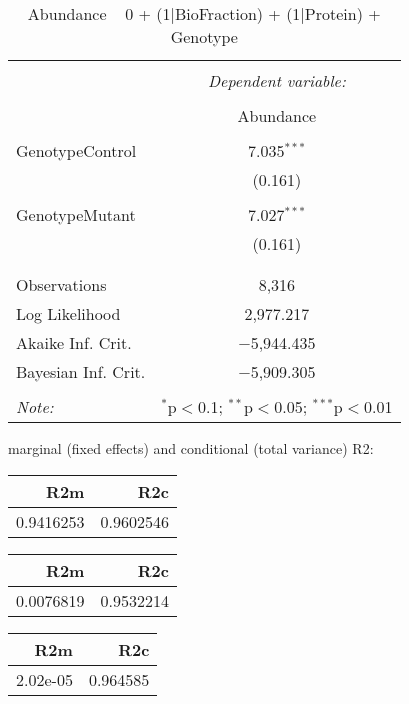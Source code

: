 \documentclass[11pt]{report}
\begin{document}
\begin{table}[!htbp] \centering 
  \caption{Abundance ~ 0 + (1|BioFraction) + (1|Protein) + Genotype} 
  \label{} 
\begin{tabular}{@{\extracolsep{5pt}}lc} 
\\[-1.8ex]\hline 
\hline \\[-1.8ex] 
 & \multicolumn{1}{c}{\textit{Dependent variable:}} \\ 
\cline{2-2} 
\\[-1.8ex] & Abundance \\ 
\hline \\[-1.8ex] 
 GenotypeControl & 7.035$^{***}$ \\ 
  & (0.161) \\ 
  & \\ 
 GenotypeMutant & 7.027$^{***}$ \\ 
  & (0.161) \\ 
  & \\ 
\hline \\[-1.8ex] 
Observations & 8,316 \\ 
Log Likelihood & 2,977.217 \\ 
Akaike Inf. Crit. & $-$5,944.435 \\ 
Bayesian Inf. Crit. & $-$5,909.305 \\ 
\hline 
\hline \\[-1.8ex] 
\textit{Note:}  & \multicolumn{1}{r}{$^{*}$p$<$0.1; $^{**}$p$<$0.05; $^{***}$p$<$0.01} \\ 
\end{tabular} 
\end{table} 
marginal (fixed effects) and conditional (total variance) R2:

\begin{tabular}{r|r}
\hline
R2m & R2c\\
\hline
0.9416253 & 0.9602546\\
\hline
\end{tabular}

\begin{tabular}{r|r}
\hline
R2m & R2c\\
\hline
0.0076819 & 0.9532214\\
\hline
\end{tabular}

\begin{tabular}{r|r}
\hline
R2m & R2c\\
\hline
2.02e-05 & 0.964585\\
\hline
\end{tabular}
\end{document}
